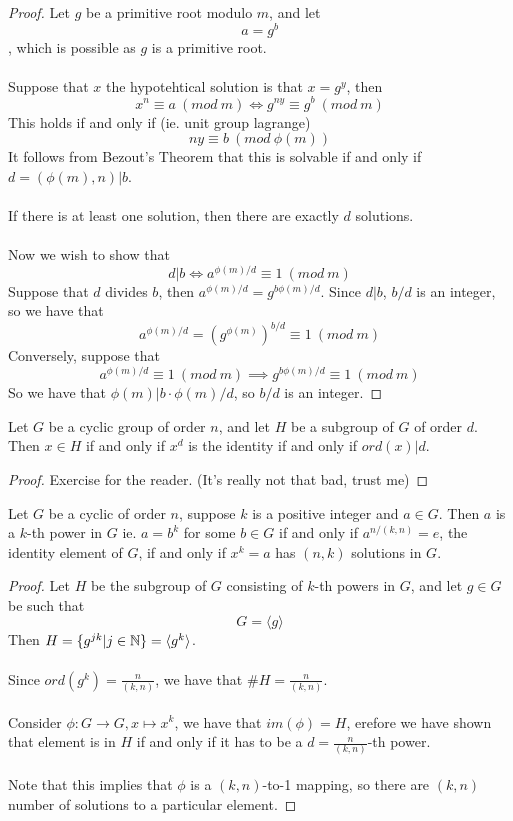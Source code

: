 \begin{proof}
Let $g$ be a primitive root modulo $m$, and let
\[a = g^b\]
, which is possible as $g$ is a primitive root.\\\\
Suppose that $x$ the hypotehtical solution is that $x = g^y$, then
\[x^n \equiv a\ (mod\ m) \iff g^{ny} \equiv g^b\ (mod\ m)\]
This holds if and only if (ie. unit group lagrange)
\[ny \equiv b\ (mod\ \phi(m))\]
It follows from Bezout's Theorem that this is solvable if and only if $d = (\phi(m), n) | b$.\\\\
If there is at least one solution, then there are exactly $d$ solutions.\\\\
Now we wish to show that
\[d | b \iff a^{\phi(m)/d} \equiv 1\ (mod\ m)\]
Suppose that $d$ divides $b$, then $a^{\phi(m)/d} = g^{b\phi(m)/d}$. Since $d | b$, $b/d$ is an integer, so we have that
\[a^{\phi(m)/d} = (g^{\phi(m)})^{b/d} \equiv 1\ (mod\ m)\]
Conversely, suppose that
\[a^{\phi(m)/d} \equiv 1\ (mod\ m) \implies g^{b\phi(m)/d} \equiv 1\ (mod\ m)\]
So we have that $\phi(m) | b \cdot \phi(m)/d$, so $b/d$ is an integer.
\end{proof}

\begin{lemma}
Let $G$ be a cyclic group of order $n$, and let $H$ be a subgroup of $G$ of order $d$. Then $x \in H$ if and only if $x^d$ is the identity if and only if $ord(x) | d$.
\end{lemma}

\begin{proof}
Exercise for the reader. (It's really not that bad, trust me)
\end{proof}

\begin{theorem}
Let $G$ be a cyclic of order $n$, suppose $k$ is a positive integer and $a \in G$. Then $a$ is a $k$-th power in $G$ ie. $a = b^k$ for some $b \in G$ if and only if $a^{n/(k, n)} = e$, the identity element of $G$, if and only if $x^k = a$ has $(n, k)$ solutions in $G$.
\end{theorem}

\begin{proof}
Let $H$ be the subgroup of $G$ consisting of $k$-th powers in $G$, and let $g \in G$ be such that
\[G = \langle g \rangle\]
Then $H = \{g^{jk} | j \in \mathbb{N}\} = \langle g^k \rangle$.\\\\
Since $ord(g^k) = \frac{n}{(k, n)}$, we have that $\#H = \frac{n}{(k, n)}$.\\\\
Consider $\phi: G \to G, x \mapsto x^k$, we have that $im(\phi) = H$, erefore we have shown that element is in $H$ if and only if it has to be a $d = \frac{n}{(k, n)}$-th power.\\\\
Note that this implies that $\phi$ is a $(k, n)$-to-1 mapping, so there are $(k, n)$  number of solutions to a particular element.
\end{proof}

